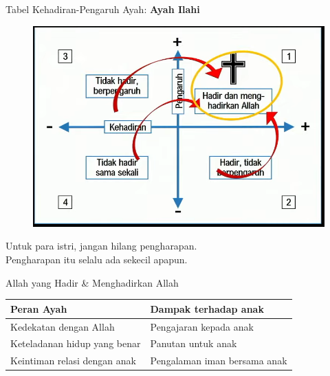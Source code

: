 \documentclass{beamer}
\theoremstyle{mystyle}
\begin{document}
\begin{frame}{Tabel Kehadiran-Pengaruh Ayah: \textbf{Ayah Ilahi}}
	\begin{figure}[!ht]
	\centering
	\includegraphics[scale=.3]{images/tabel-ayah-ilahi-panah}
\end{figure}	
Untuk para istri, jangan hilang pengharapan.\\ 
Pengharapan itu selalu ada sekecil apapun.
\end{frame}

\begin{frame}{Allah yang Hadir \& Menghadirkan Allah}
	\begin{table}[!ht]
		\begin{tabular}{|l|l|}
			\hline
			\textbf{Peran Ayah}           & \textbf{Dampak terhadap anak} \\
			\hline
			Kedekatan dengan Allah        & Pengajaran kepada anak \\
			\hline
			Keteladanan hidup yang benar  & Panutan untuk anak \\
			\hline
			Keintiman relasi dengan anak  & Pengalaman iman bersama anak \\
			\hline
		\end{tabular}
	\end{table}
\end{frame}
\end{document}
